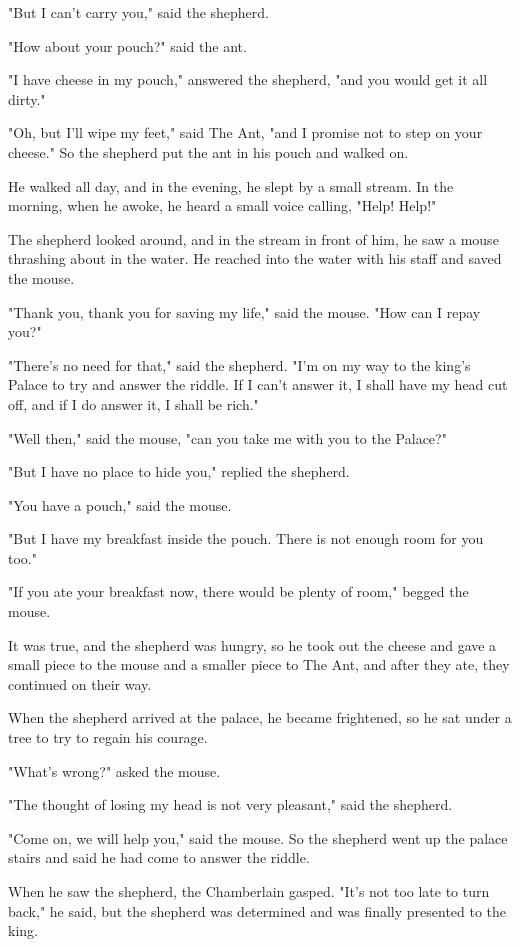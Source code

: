 "But I can't carry you," said the shepherd.

"How about your pouch?" said the ant.

"I have cheese in my pouch," answered the shepherd, "and you would get it all dirty."

"Oh, but I'll wipe my feet," said The Ant, "and I promise not to step on your cheese." So the shepherd put the ant in his pouch and walked on.

He walked all day, and in the evening, he slept by a small stream. In the morning, when he awoke, he heard a small voice calling, "Help! Help!"

The shepherd looked around, and in the stream in front of him, he saw a mouse thrashing about in the water. He reached into the water with his staff and saved the mouse.

"Thank you, thank you for saving my life," said the mouse. "How can I repay you?"

"There's no need for that," said the shepherd. "I'm on my way to the king's Palace to try and answer the riddle. If I can't answer it, I shall have my head cut off, and if I do answer it, I shall be rich."

"Well then," said the mouse, "can you take me with you to the Palace?"

"But I have no place to hide you," replied the shepherd.

"You have a pouch," said the mouse.

"But I have my breakfast inside the pouch. There is not enough room for you too."

"If you ate your breakfast now, there would be plenty of room," begged the mouse.

It was true, and the shepherd was hungry, so he took out the cheese and gave a small piece to the mouse and a smaller piece to The Ant, and after they ate, they continued on their way.

When the shepherd arrived at the palace, he became frightened, so he sat under a tree to try to regain his courage.

"What's wrong?" asked the mouse.

"The thought of losing my head is not very pleasant," said the shepherd.

"Come on, we will help you," said the mouse. So the shepherd went up the palace stairs and said he had come to answer the riddle.

When he saw the shepherd, the Chamberlain gasped. "It's not too late to turn back," he said, but the shepherd was determined and was finally presented to the king.

